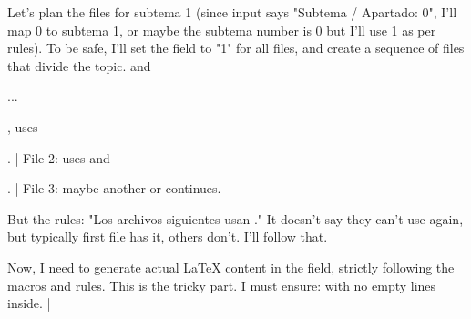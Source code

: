 { Let's plan the files for subtema 1 (since input says "Subtema / Apartado: 0", I'll map 0 to subtema 1, or maybe the subtema number is 0 but I'll use 1 as per rules). To be safe, I'll set the  field to "1" for all files, and create a sequence of files that divide the topic.
 and \cmd{}

...

, uses 

\cmd{\subtituloA}

\cmd{\lista}

\cmd{\nota}. |
  File 2: uses \cmd{} and \cmd{\lista}

\cmd{\nota}. |
  File 3: maybe another \cmd{\subtituloA} or continues.

But the rules: "Los archivos siguientes usan ." It doesn't say they can't use \cmd{\secciongrande} again, but typically first file has it, others don't. I'll follow that.

Now, I need to generate actual LaTeX content in the  field, strictly following the macros and rules. This is the tricky part. I must ensure:
 with no empty lines inside.
 |
  \cmd{}}
